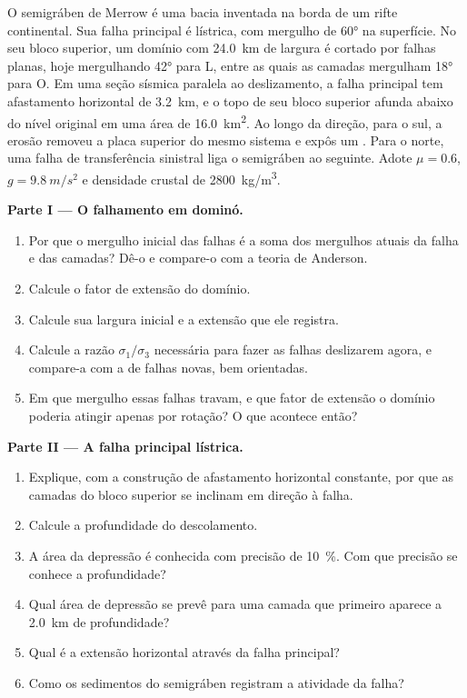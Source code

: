 \begin{problem}
\label{pb:b3:extension-strike-slip:1}
O semigráben de Merrow é uma bacia inventada na borda de um rifte continental.
Sua falha principal é lístrica, com mergulho de \ang{60} na superfície. No seu
bloco superior, um domínio com \qty{24.0}{km} de largura é cortado por falhas planas, hoje
mergulhando \ang{42} para L, entre as quais as camadas mergulham \ang{18} para O. Em uma
seção sísmica paralela ao deslizamento, a falha principal tem afastamento horizontal de
\qty{3.2}{km}, e o topo de seu bloco superior afunda abaixo do nível original em uma área de
\qty{16.0}{km^2}. Ao longo da direção, para o sul, a erosão removeu a placa superior do mesmo
sistema e expôs um . Para o norte, uma falha de transferência
sinistral liga o semigráben ao seguinte. Adote $\mu =
0.6$, $g = \qty{9.8}{m/s^2}$ e densidade crustal de
\qty{2800}{kg/m^3}.

\medskip\noindent\textbf{Parte I --- O falhamento em dominó.}
\begin{enumerate}
  \item Por que o mergulho inicial das falhas é a soma dos mergulhos atuais da falha e
        das camadas? Dê-o e compare-o com a teoria de Anderson.
  \item Calcule o fator de extensão do domínio.
  \item Calcule sua largura inicial e a extensão que ele registra.
  \item Calcule a razão $\sigma_1/\sigma_3$ necessária para fazer as falhas deslizarem agora,
        e compare-a com a de falhas novas, bem orientadas.
  \item Em que mergulho essas falhas travam, e que fator de extensão o domínio poderia
        atingir apenas por rotação? O que acontece então?
\end{enumerate}

\medskip\noindent\textbf{Parte II --- A falha principal lístrica.}
\begin{enumerate}[resume]
  \item Explique, com a construção de afastamento horizontal constante, por que as camadas do bloco
        superior se inclinam em direção à falha.
  \item Calcule a profundidade do descolamento.
  \item A área da depressão é conhecida com precisão de \qty{10}{\percent}. Com que
        precisão se conhece a profundidade?
  \item Qual área de depressão se prevê para uma camada que primeiro aparece a \qty{2.0}{km}
        de profundidade?
  \item Qual é a extensão horizontal através da falha principal?
  \item Como os sedimentos do semigráben registram a atividade da
        falha?
\end{enumerate}


\end{problem}

